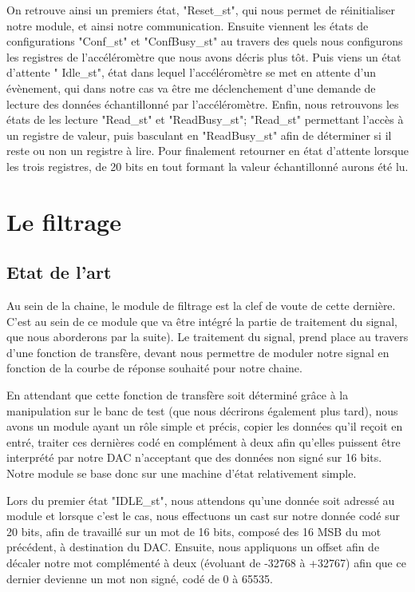 \documentclass[french,a4paper,12pt]{report}
\begin{document}
			On retrouve ainsi un premiers état, "Reset\_st", qui nous permet de réinitialiser notre module, et ainsi notre communication. Ensuite viennent les états de configurations "Conf\_st" et "ConfBusy\_st" au travers des quels nous configurons les registres de l'accéléromètre que nous avons décris plus tôt. Puis viens un état d'attente " Idle\_st", état dans lequel l'accéléromètre se met en attente d'un évènement, qui dans notre cas va être me déclenchement d'une demande de lecture des données échantillonné par l'accéléromètre. Enfin, nous retrouvons les états de les lecture "Read\_st" et "ReadBusy\_st"; "Read\_st" permettant l'accès à un registre de valeur, puis basculant en "ReadBusy\_st" afin de déterminer si il reste ou non un registre à lire. Pour finalement retourner en état d'attente lorsque les trois registres, de 20 bits en tout formant la valeur échantillonné aurons été lu.		
	
	\chapter{Le filtrage}
	
	\section{Etat de l'art}
	Au sein de la chaine, le module de filtrage est la clef de voute de cette dernière. C'est au sein de ce module que va être intégré la partie de traitement du signal, que nous aborderons par la suite). Le traitement du signal, prend place au travers d'une fonction de transfère, devant nous permettre de moduler notre signal en fonction de la courbe de réponse souhaité pour notre chaine.
	
	En attendant que cette fonction de transfère soit déterminé grâce à la manipulation sur le banc de test (que nous décrirons également plus tard), nous avons un module ayant un rôle simple et précis, copier les données qu'il reçoit en entré, traiter ces dernières codé en complément à deux afin qu'elles puissent être interprété par notre DAC n'acceptant que des données non signé sur 16 bits. Notre module se base donc sur une machine d'état relativement simple.
	
	Lors du premier état "IDLE\_st", nous attendons qu'une donnée soit adressé au module et lorsque c'est le cas, nous effectuons un cast sur notre donnée codé sur 20 bits, afin de travaillé sur un mot de 16 bits, composé des 16 MSB du mot précédent, à destination du DAC. Ensuite, nous appliquons un offset afin de décaler notre mot complémenté à deux (évoluant de -32768 à +32767) afin que ce dernier devienne un mot non signé, codé de 0 à 65535.
	
\end{document}
